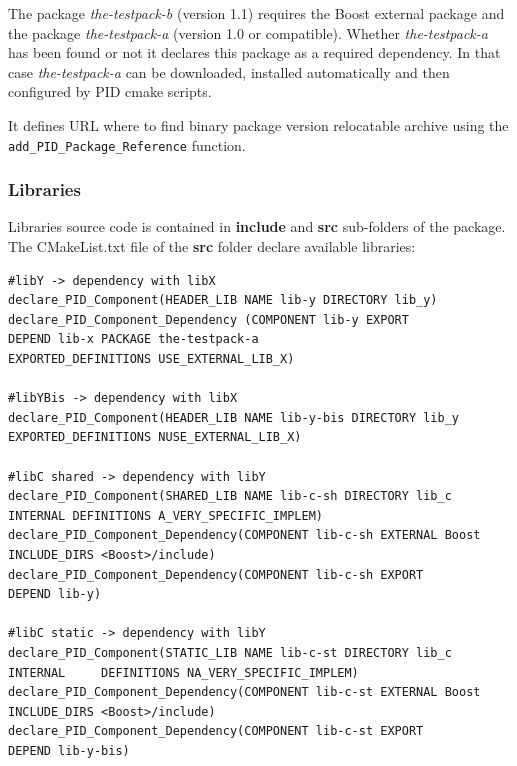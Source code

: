 \documentclass[12pt,a4paper]{article}
\begin{document}
The package \textit{the-testpack-b} (version 1.1) requires the Boost external package and the package \textit{the-testpack-a} (version 1.0 or compatible). Whether \textit{the-testpack-a} has been found or not it declares this package as a required dependency. In that case \textit{the-testpack-a} can be downloaded, installed automatically and then configured by PID cmake scripts.

It defines URL where to find binary package version relocatable archive using the \texttt{add\_PID\_Package\_Reference} function.

\subsubsection{Libraries}

Libraries source code is contained in \textbf{include} and \textbf{src} sub-folders of the package. The CMakeList.txt file of the \textbf{src} folder declare available libraries:

\begin{verbatim}
#libY -> dependency with libX
declare_PID_Component(HEADER_LIB NAME lib-y DIRECTORY lib_y)
declare_PID_Component_Dependency (COMPONENT lib-y EXPORT 
DEPEND lib-x PACKAGE the-testpack-a
EXPORTED_DEFINITIONS USE_EXTERNAL_LIB_X)

#libYBis -> dependency with libX
declare_PID_Component(HEADER_LIB NAME lib-y-bis DIRECTORY lib_y
EXPORTED_DEFINITIONS NUSE_EXTERNAL_LIB_X)

#libC shared -> dependency with libY
declare_PID_Component(SHARED_LIB NAME lib-c-sh DIRECTORY lib_c
INTERNAL DEFINITIONS A_VERY_SPECIFIC_IMPLEM)
declare_PID_Component_Dependency(COMPONENT lib-c-sh EXTERNAL Boost 
INCLUDE_DIRS <Boost>/include)
declare_PID_Component_Dependency(COMPONENT lib-c-sh EXPORT 
DEPEND lib-y)

#libC static -> dependency with libY
declare_PID_Component(STATIC_LIB NAME lib-c-st DIRECTORY lib_c
INTERNAL	 DEFINITIONS NA_VERY_SPECIFIC_IMPLEM)
declare_PID_Component_Dependency(COMPONENT lib-c-st EXTERNAL Boost 
INCLUDE_DIRS <Boost>/include)
declare_PID_Component_Dependency(COMPONENT lib-c-st EXPORT 
DEPEND lib-y-bis)
\end{verbatim}
\end{document}
